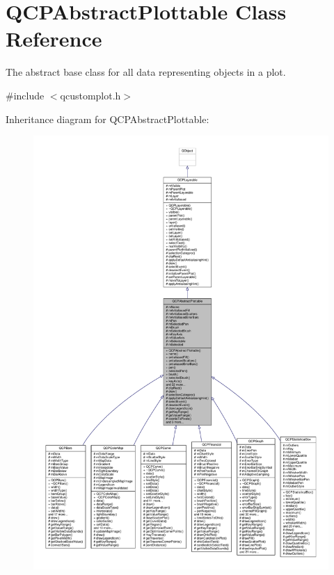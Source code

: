 \hypertarget{class_q_c_p_abstract_plottable}{}\section{Q\+C\+P\+Abstract\+Plottable Class Reference}
\label{class_q_c_p_abstract_plottable}


The abstract base class for all data representing objects in a plot.  




{\ttfamily \#include $<$qcustomplot.\+h$>$}



Inheritance diagram for Q\+C\+P\+Abstract\+Plottable\+:\nopagebreak
\begin{figure}[H]
\begin{center}
\leavevmode
\includegraphics[width=350pt]{class_q_c_p_abstract_plottable__inherit__graph}
\end{center}
\end{figure}


